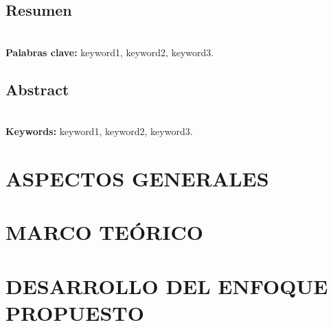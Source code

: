 \documentclass[12pt,oneside,a4paper]{book}
\theoremstyle{definition}
\begin{document}

\chapter*{Resumen}

\blindtext
\\

\noindent \textbf{Palabras clave:} keyword1, keyword2, keyword3.

\chapter*{Abstract}

\blindtext
\\

\noindent \textbf{Keywords:} keyword1, keyword2, keyword3.

\tableofcontents    %

\renewcommand\listtablename{ÍNDICE DE TABLAS}
\renewcommand\listfigurename{ÍNDICE DE FIGURAS}
\listoftables
\listoffigures

\mainmatter

\fancyhead[RE,LO]{\thesection}

\onehalfspacing            %


\part{ASPECTOS GENERALES}


\part{MARCO TEÓRICO}



\part{DESARROLLO DEL ENFOQUE PROPUESTO}
  


\end{document}
